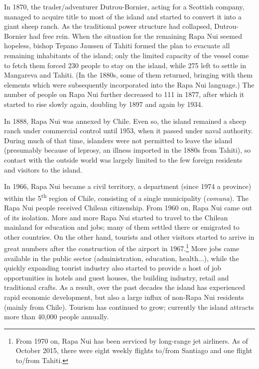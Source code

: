 In 1870, the  trader/adventurer Dutrou-Bornier, acting for a Scottish company, managed to acquire title to most of the island and started to convert it into a giant sheep ranch. As the traditional power structure had collapsed, Dutrou-Bornier had free rein. When the situation for the remaining Rapa Nui seemed hopeless, bishop Tepano Jaussen  of Tahiti formed the plan to evacuate all remaining inhabitants of the island; only the limited capacity of the vessel come to fetch them forced 230 people to stay on the island, while 275 left to settle in Mangareva and Tahiti. (In the 1880s, some of them returned, bringing with them  elements which were subsequently incorporated into the Rapa Nui language.) The number of people on Rapa Nui further decreased to 111 in 1877, after which it started to rise slowly again, doubling by 1897 and again by 1934. 

\largerpage
In 1888, Rapa Nui was annexed by Chile. Even so, the island remained a sheep ranch under commercial control until 1953, when it passed under naval authority. During much of that time, islanders were not permitted to leave the island (presumably because of leprosy, an illness imported in the 1880s from Tahiti), so contact with the outside world was largely limited to the few foreign residents and visitors to the island.

In 1966, Rapa Nui became a civil territory, a department (since 1974 a province) within the 5\textsuperscript{th} region of Chile, consisting of a single municipality (\textit{comuna}). The Rapa Nui people received Chilean citizenship.  From 1960 on, Rapa Nui came out of its isolation. More and more Rapa Nui started to travel to the Chilean mainland for education and jobs; many of them settled there or emigrated to other countries. On the other hand, tourists and other visitors started to arrive in great numbers after the construction of the airport in 1967.\footnote{\label{fn:10}From 1970 on, Rapa Nui has been serviced by long-range jet airliners. As of October 2015, there were eight weekly flights to/from Santiago and one flight to/from Tahiti.} More jobs came available in the public sector (administration, education, health...), while the quickly expanding tourist industry also started to provide a host of job opportunities in hotels and guest houses, the building industry, retail and traditional crafts. As a result, over the past decades the island has experienced rapid economic development, but also a large influx of non-Rapa Nui residents (mainly from Chile). Tourism has continued to grow; currently the island attracts more than 40,000 people annually.

